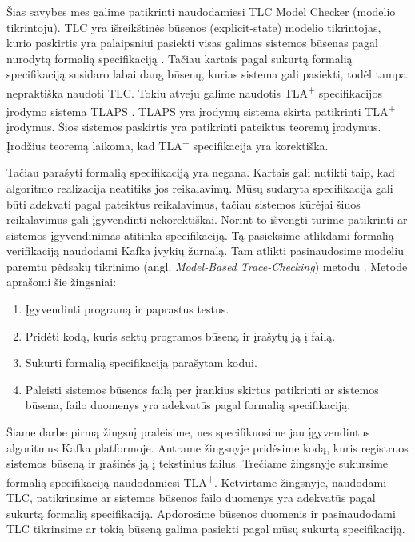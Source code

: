 \documentclass{VUMIFPSmagistrinis}
\begin{document}
	Šias savybes mes galime patikrinti naudodamiesi TLC Model Checker (modelio tikrintoju).
		TLC yra išreikštinės būsenos (explicit-state) modelio tikrintojas, kurio paskirtis yra palaipsniui pasiekti visas galimas sistemos būsenas pagal nurodytą formalią specifikaciją \cite{yu1999model}.
		Tačiau kartais pagal sukurtą formalią specifikaciją susidaro labai daug būsenų, kurias sistema gali pasiekti, todėl tampa nepraktiška naudoti TLC.
		Tokiu atveju galime naudotis TLA\textsuperscript{+} specifikacijos įrodymo sistema TLAPS \cite{cousineau2012tla+}.
		TLAPS yra įrodymų sistema skirta patikrinti TLA\textsuperscript{+} įrodymus.
		Šios sistemos paskirtis yra patikrinti pateiktus teoremų įrodymus.
		Įrodžius teoremą laikoma, kad TLA\textsuperscript{+} specifikacija yra korektiška.


		Tačiau parašyti formalią specifikaciją yra negana.
		Kartais gali nutikti taip, kad algoritmo realizacija neatitiks jos reikalavimų.
		Mūsų sudaryta specifikacija gali būti adekvati pagal pateiktus reikalavimus, tačiau sistemos kūrėjai šiuos reikalavimus gali įgyvendinti nekorektiškai.
		Norint to išvengti turime patikrinti ar sistemos įgyvendinimas atitinka specifikaciją.
		Tą pasieksime atlikdami formalią verifikaciją naudodami Kafka įvykių žurnalą.
		Tam atlikti pasinaudosime modeliu paremtu pėdsakų tikrinimo (angl. {\it Model-Based Trace-Checking}) metodu \cite{ltx}.
		Metode aprašomi šie žingsniai:
		\begin{enumerate}
			\item{Įgyvendinti programą ir paprastus testus.}
			\item{Pridėti kodą, kuris sektų programos būseną ir įrašytų ją į failą.}
			\item{Sukurti formalią specifikaciją parašytam kodui.}
			\item{Paleisti sistemos būsenos failą per įrankius skirtus patikrinti ar sistemos būsena, failo duomenys yra adekvatūs pagal formalią specifikaciją.}
		\end{enumerate}

		Šiame darbe pirmą žingsnį praleisime, nes specifikuosime jau įgyvendintus algoritmus Kafka platformoje.
		Antrame žingsnyje pridėsime kodą, kuris registruos sistemos būseną ir įrašinės ją į tekstinius failus.
		Trečiame žingsnyje sukursime formalią specifikaciją naudodamiesi TLA\textsuperscript{+}.
		Ketvirtame žingsnyje, naudodami TLC, patikrinsime ar sistemos būsenos failo duomenys yra adekvatūs pagal sukurtą formalią specifikaciją. Apdorosime būsenos duomenis ir pasinaudodami TLC tikrinsime ar tokią būseną galima pasiekti pagal mūsų sukurtą specifikaciją.
\end{document}

